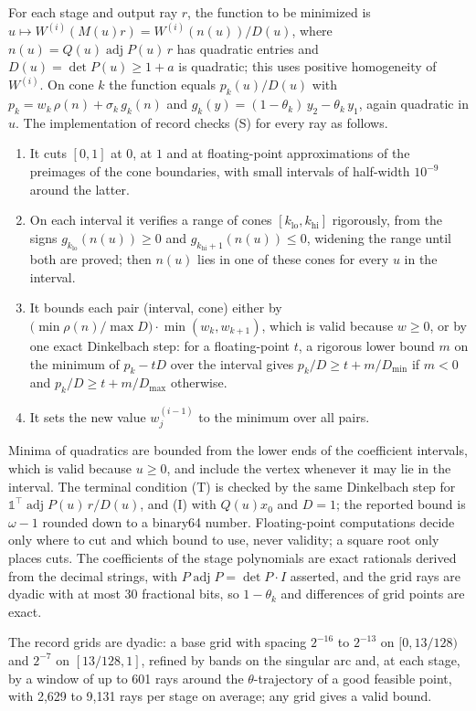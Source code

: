 For each stage and output ray $r$, the function to be minimized is $u \mapsto W^{(i)}(M(u)r) = W^{(i)}(n(u))/D(u)$, where $n(u) = Q(u)\operatorname{adj}P(u)\,r$ has quadratic entries and $D(u) = \det P(u) \ge 1 + a$ is quadratic; this uses positive homogeneity of $W^{(i)}$.
On cone $k$ the function equals $p_k(u)/D(u)$ with $p_k = w_k\,\rho(n) + \sigma_k\,g_k(n)$ and $g_k(y) = (1-\theta_k)\,y_2 - \theta_k\,y_1$, again quadratic in $u$.
The implementation of record checks (S) for every ray as follows.
\begin{enumerate}
\item It cuts $[0,1]$ at $0$, at $1$ and at floating-point approximations of the preimages of the cone boundaries, with small intervals of half-width $10^{-9}$ around the latter.
\item On each interval it verifies a range of cones $[k_{\mathrm{lo}}, k_{\mathrm{hi}}]$ rigorously, from the signs $g_{k_{\mathrm{lo}}}(n(u)) \ge 0$ and $g_{k_{\mathrm{hi}}+1}(n(u)) \le 0$, widening the range until both are proved; then $n(u)$ lies in one of these cones for every $u$ in the interval.
\item It bounds each pair (interval, cone) either by $\bigl(\min\rho(n)/\max D\bigr)\cdot\min(w_k, w_{k+1})$, which is valid because $w \ge 0$, or by one exact Dinkelbach step: for a floating-point $t$, a rigorous lower bound $m$ on the minimum of $p_k - tD$ over the interval gives $p_k/D \ge t + m/D_{\min}$ if $m < 0$ and $p_k/D \ge t + m/D_{\max}$ otherwise.
\item It sets the new value $w^{(i-1)}_j$ to the minimum over all pairs.
\end{enumerate}
Minima of quadratics are bounded from the lower ends of the coefficient intervals, which is valid because $u \ge 0$, and include the vertex whenever it may lie in the interval.
The terminal condition (T) is checked by the same Dinkelbach step for $\mathbb{1}^\top\operatorname{adj}P(u)\,r/D(u)$, and (I) with $Q(u)x_0$ and $D = 1$; the reported bound is $\omega - 1$ rounded down to a binary64 number.
Floating-point computations decide only where to cut and which bound to use, never validity; a square root only places cuts.
The coefficients of the stage polynomials are exact rationals derived from the decimal strings, with $P\operatorname{adj}P = \det P\cdot I$ asserted, and the grid rays are dyadic with at most 30 fractional bits, so $1 - \theta_k$ and differences of grid points are exact.

The record grids are dyadic: a base grid with spacing $2^{-16}$ to $2^{-13}$ on $[0,13/128)$ and $2^{-7}$ on $[13/128,1]$, refined by bands on the singular arc and, at each stage, by a window of up to 601 rays around the $\theta$-trajectory of a good feasible point, with 2,629 to 9,131 rays per stage on average; any grid gives a valid bound.


